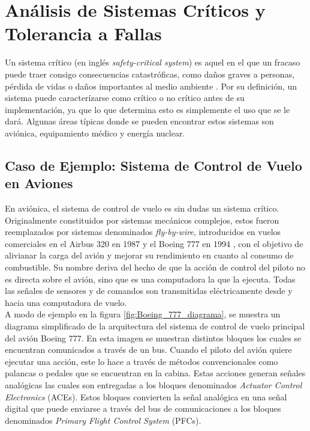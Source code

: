 \section{Análisis de Sistemas Críticos y Tolerancia a Fallas}

Un sistema crítico (en inglés \textit{safety-critical system}) es aquel en el que un fracaso puede traer consigo consecuencias catastróficas, como daños graves a personas, pérdida de vidas o daños importantes al medio ambiente \cite[p.~271]{kopetz-2011}. Por su definición, un sistema puede caracterízarse como crítico o no crítico antes de su implementación, ya que lo que determina esto es simplemente el uso que se le dará. Algunas áreas típicas donde se pueden encontrar estos sistemas son aviónica, equipamiento médico y energía nuclear.\\

\subsection{Caso de Ejemplo: Sistema de Control de Vuelo en Aviones}

En aviónica, el sistema de control de vuelo es sin dudas un sistema crítico. Originalmente constituidos por sistemas mecánicos complejos, estos fueron reemplazados por sistemas denominados \textit{fly-by-wire}, introducidos en vuelos comerciales en el Airbus 320 en 1987 y el Boeing 777 en 1994 \cite{FBWNASA}, con el objetivo de alivianar la carga del avión y mejorar su rendimiento en cuanto al consumo de combustible. Su nombre deriva del hecho de que la acción de control del piloto no es directa sobre el avión, sino que es una computadora la que la ejecuta. Todas las señales de sensores y de comandos son transmitidas eléctricamente desde y hacia una computadora de vuelo.\\

A modo de ejemplo en la figura \ref{fig:Boeing_777_diagrama}, se muestra un diagrama simplificado de la arquitectura del sistema de control de vuelo principal del avión Boeing 777. En esta imagen se muestran distintos bloques los cuales se encuentran comunicados a través de un bus. Cuando el piloto del avión quiere ejecutar una acción, este lo hace a través de métodos convencionales como palancas o pedales que se encuentran en la cabina. Estas acciones generan señales analógicas las cuales son entregadas a los bloques denominados \textit{Actuator Control Electronics} (ACEs). Estos bloques convierten la señal analógica en una señal digital que puede enviarse a través del bus de comunicaciones a los bloques denominados \textit{Primary Flight Control System} (PFCs).

